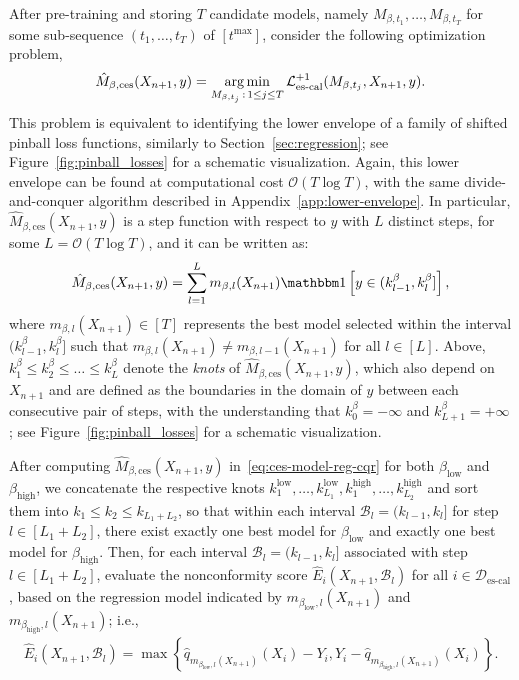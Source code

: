After pre-training and storing $T$ candidate models, namely $M_{\beta,t_1}, \ldots, M_{\beta,t_T}$ for some sub-sequence $(t_1, \ldots, t_T)$ of $[t^{\text{max}}]$, consider the following optimization problem,
\begin{align} \label{eq:ces-model-reg-cqr}
  \hat{M}_{\beta, \text{ces}}(X_{n+1},y) = \operatorname*{arg\,min}_{M_{\beta, t_j} \, : \, 1 \leq j \leq T} \mathcal{L}_{\text{es-cal}}^{+1}(M_{\beta, t_j},X_{n+1},y).
\end{align}
This problem is equivalent to identifying the lower envelope of a family of shifted pinball loss functions, similarly to Section~\ref{sec:regression}; see Figure~\ref{fig:pinball_losses} for a schematic visualization.
Again, this  lower envelope can be found at computational cost $\mathcal{O}(T \log T)$, with the same divide-and-conquer algorithm described in Appendix~\ref{app:lower-envelope}.
In particular, $\hat{M}_{\beta, \text{ces}}(X_{n+1},y)$ is a step function with respect to $y$ with $L$ distinct steps, for some $L = \mathcal{O}(T \log T)$, and it can be written as:
\begin{align} \label{eq:reg-step-func-cqr}
 \hat{M}_{\beta, \text{ces}}(X_{n+1},y) = \sum_{l=1}^{L} m_{\beta, l}(X_{n+1}) \I{y \in (k^{\beta}_{l-1}, k^{\beta}_{l}] },
\end{align}
where $m_{\beta, l}(X_{n+1}) \in [T]$ represents the best model selected within the interval $(k^{\beta}_{l-1}, k^{\beta}_{l}]$ such that $m_{\beta,l}(X_{n+1}) \neq m_{\beta, l-1}(X_{n+1})$ for all $l \in [L]$.
Above, $k^{\beta}_{1}\leq k^{\beta}_{2} \leq \dots \leq k^{\beta}_{L}$ denote the {\em knots} of $\hat{M}_{\beta, \text{ces}}(X_{n+1},y)$, which also depend on $X_{n+1}$ and are defined as the boundaries in the domain of $y$ between each consecutive pair of steps, with the understanding that $k^{\beta}_0 = -\infty$ and $k^{\beta}_{L+1} = +\infty$; see Figure~\ref{fig:pinball_losses} for a schematic visualization.

After computing $\hat{M}_{\beta, \text{ces}}(X_{n+1},y)$ in~\eqref{eq:ces-model-reg-cqr} for both  $\beta_{\text{low}}$ and $\beta_{\text{high}}$, we concatenate the respective knots $k_1^{\text{low}}, \dots, k^{\text{low}}_{L_1}, k_1^{\text{high}}, \dots, k_{L_2}^{\text{high}}$ and sort them into $k_1 \leq k_2 \leq k_{L_1+L_2}$, so that within each interval $\mathcal{B}_l = (k_{l-1}, k_{l}]$ for step $l \in [L_1 + L_2]$, there exist exactly one best model for $\beta_{\text{low}}$ and exactly one best model for $\beta_{\text{high}}$. 
Then, for each interval $\mathcal{B}_l = (k_{l-1}, k_{l}]$ associated with step $l \in[L_1 + L_2]$, evaluate the nonconformity score $\hat{E}_i(X_{n+1}, \mathcal{B}_l)$ for all $i \in \mathcal{D}_{\text{es-cal}}$, based on the regression model indicated by $m_{\beta_{\text{low}},l}(X_{n+1})$ and $m_{\beta_{\text{high}},l}(X_{n+1})$; i.e.,
\begin{align} \label{eq:scores-reg-cqr}
  \hat{E}_i(X_{n+1}, \mathcal{B}_l) = \max\left\{\hat{q}_{m_{\beta_{\text{low}},l}(X_{n+1})}(X_i) - Y_i, Y_i - \hat{q}_{m_{\beta_{\text{high}},l}(X_{n+1})}(X_i)\right\}.
\end{align}



